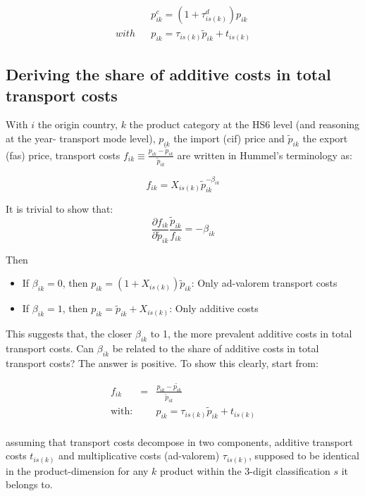 \documentclass[a4paper,12pt]{article}
\begin{document}
\begin{eqnarray*}
&&p^c_{ik} = (1+\tau^d_{is(k)})p_{ik} \\
with && p_{ik}  = \tau_{is(k)} \widetilde{p}_{ik} +t_{is(k)}
\end{eqnarray*}


\subsection{Deriving the share of additive costs in total transport costs \label{app:interpret_beta}}


With $i$ the origin country, $k$ the product category at the HS6 level (and reasoning at the year- transport mode level), $p_{ik}$ the import (cif) price and $\tilde{p}_{ik}$ the export (fas) price, transport costs $f_{ik}\equiv \frac{p_{ik}- \tilde{p}_{ik}}{\tilde{p}_{ik}} $ are written in Hummel's terminology as:


\begin{equation}
f_{ik} = X_{is(k)}\tilde{p}_{ik}^{-\beta_{ik}} \label{eq:Hummels}
\end{equation}

It is trivial to show that:
$$\frac{\partial f_{ik}}{\partial \tilde{p}_{ik}} \frac{\tilde{p}_{ik}}{f_{ik}}= -\beta_{ik}$$

Then
\begin{itemize}
\item If $\beta_{ik} = 0$, then $p_{ik} = (1+X_{is(k)})\tilde{p}_{ik}$: Only ad-valorem transport costs
\item If $\beta_{ik} = 1$, then $p_{ik}=\tilde{p}_{ik}+X_{is(k)}$: Only additive costs
\end{itemize}

This suggests that, the closer $\beta_{ik}$ to 1, the more prevalent additive costs in total transport costs. Can $\beta_{ik}$ be related to the share of additive costs in total transport costs? The answer is positive. To show this clearly, start from:

\begin{eqnarray*}
f_{ik} &=& \frac{p_{ik}-\tilde{p_{ik}}}{\tilde{p}_{ik}}\\
\text{with}:&& p_{ik} = \tau_{is(k)}\tilde{p}_{ik} + t_{is(k)} \\
\end{eqnarray*}

assuming that transport costs decompose in two components, additive transport costs $t_{is(k)}$ and multiplicative costs (ad-valorem) $\tau_{is(k)}$, supposed to be identical in the product-dimension for any $k$ product within the 3-digit classification $s$ it belongs to.
\end{document}
